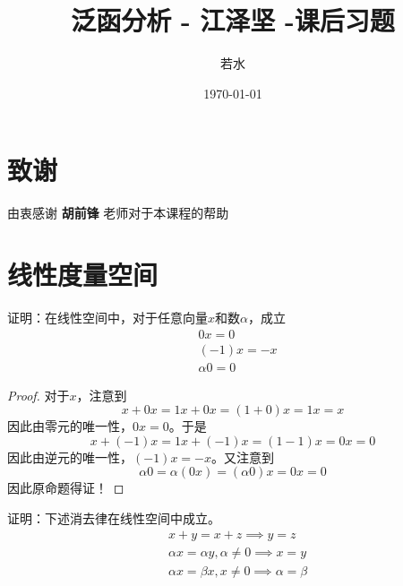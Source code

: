 \documentclass[lang = cn, scheme = chinese, 10pt]{elegantbook}
\title{泛函分析 - 江泽坚 -课后习题}                %
\author{若水}                        %
\date{\today}                       %
\begin{document}
\maketitle       %

\frontmatter     %

\chapter*{致谢}


\vspace*{\fill}
\begin{center}
	
	\large{由衷感谢 \textbf{ 胡前锋 } 老师对于本课程的帮助}
	
\end{center}
\vspace*{\fill}

\tableofcontents %

\mainmatter      %

\chapter{线性度量空间}

\begin{proposition}
	证明：在线性空间中，对于任意向量$x$和数$\alpha$，成立
	\nonumber\begin{align}
		& 0x=0\\
		& (-1)x=-x\\
		&\alpha0=0
	\end{align}
\end{proposition}

\begin{proof}
	对于$x$，注意到
	$$
	x+0x=1x+0x=(1+0)x=1x=x
	$$
	因此由零元的唯一性，$0x=0$。于是
	$$
	x+(-1)x=1x+(-1)x=(1-1)x=0x=0
	$$
	因此由逆元的唯一性，$(-1)x=-x$。又注意到
	$$
	\alpha0=\alpha(0x)=(\alpha0)x=0x=0
	$$
	因此原命题得证！
\end{proof}

\begin{proposition}
	证明：下述消去律在线性空间中成立。
	\nonumber\begin{align}
		&x+y=x+z\implies y=z\\
		&\alpha x=\alpha y,\alpha\ne0\implies x=y\\
		&\alpha x=\beta x,x\ne0\implies \alpha=\beta
	\end{align}
\end{proposition}
\end{document}
